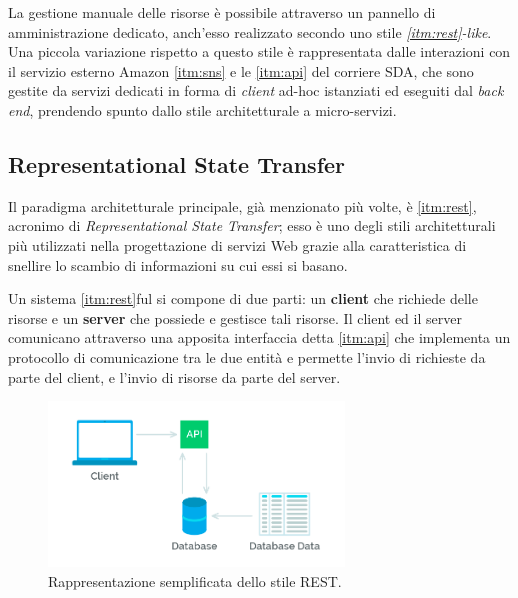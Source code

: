La gestione manuale delle risorse è possibile attraverso un pannello di amministrazione dedicato, anch'esso realizzato secondo uno stile \textit{\ref{itm:rest}-like}. Una piccola variazione rispetto a questo stile è rappresentata dalle interazioni con il servizio esterno Amazon \ref{itm:sns} e le \ref{itm:api} del corriere SDA, che sono gestite da servizi dedicati in forma di \textit{client} ad-hoc istanziati ed eseguiti dal \textit{back end}, prendendo spunto dallo stile architetturale a micro-servizi.

\subsection{Representational State Transfer}
Il paradigma architetturale principale, già menzionato più volte, è \ref{itm:rest}, acronimo di \textit{Representational State Transfer}; esso è uno degli stili architetturali più utilizzati nella progettazione di servizi Web grazie alla caratteristica di snellire lo scambio di informazioni su cui essi si basano.

Un sistema \ref{itm:rest}ful si compone di due parti: un \textbf{client} che richiede delle risorse e un \textbf{server} che possiede e gestisce tali risorse. Il client ed il server comunicano attraverso una apposita interfaccia detta \ref{itm:api} che implementa un protocollo di comunicazione tra le due entità e permette l'invio di richieste da parte del client, e l'invio di risorse da parte del server.

\begin{figure}[h!]
        \centering
        \includegraphics[width=0.7\textwidth]{figures/rest.png}
        \caption[Rappresentazione semplificata dello stile REST]{Rappresentazione semplificata dello stile REST.
        \label{fig:rest1}}
\end{figure}   


